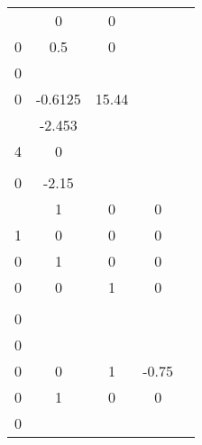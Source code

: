 \documentclass[runningheads,a4paper]{llncs}
\begin{document}
\begin{table}[htb]
\begin{tabular}{|c|c|c|c|c|}
\begin{array}{ccc}
0.5			& 0				& 0			\\
0			& 0.5 			& 0			
\end{array}\right]$ & $\left[\begin{array}{c}
16 \\ 0 \\ 0
\end{array}\right]$ & $~
\left[\begin{array}{ccc}
0.6125	& -0.6125	& 15.44 \\
\end{array}\right]$ & 0 \\ \hline
Pendulum   & $\left[\begin{array}{cc}
0		& -2.453	\\
4		& 0			\\	
\end{array}\right]$ & $\left[\begin{array}{c}
4 \\ 0
\end{array}\right]$ & $\left[\begin{array}{cc}
-1.225	& -2.15 	\\
\end{array}\right]$           & 9.8           \\ \hline
\begin{tabular}[c]{@{}c@{}}Inverted\\ Pendulum\end{tabular} & $\left[\begin{array}{cccc}
0		& 1		& 0 	& 0	\\
1		& 0		& 0		& 0	\\
0		& 1 	& 0		& 0 \\
0		& 0		& 1 	& 0 \\	
\end{array}\right]$ & $\left[\begin{array}{c}
1 \\ 0 \\ 0 \\ 0
\end{array}\right]$  & $\left[\begin{array}{cccc}
0	& 0	& 1 & -0.75 \\
0	& 1	& 0	& 0		
\end{array}\right]$ & $\left[\begin{array}{c}
0 \\
0 \end{array}\right]$ \\ \hline
\begin{tabular}[c]{@{}c@{}}Magnetic\\ Suspension\end{tabular} & $\left[\begin{array}{cc}

\end{array}
\end{tabular}
\end{table}
\end{document}
